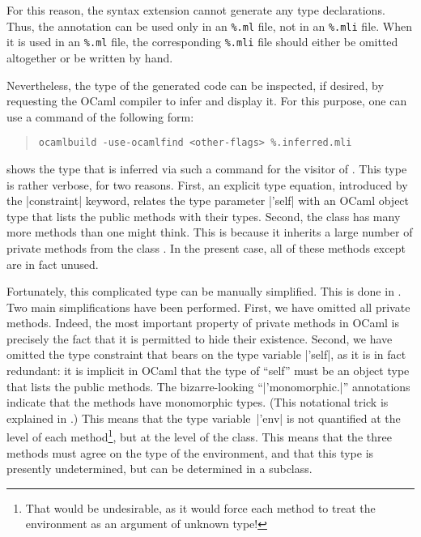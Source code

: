 \documentclass[11pt,a4paper,twoside]{article}
\begin{document}
For this reason, the \visitors syntax extension cannot generate any type
declarations. Thus, the annotation \derivingvisitors can be used only in an
\texttt{\%.ml} file, not in an \texttt{\%.mli} file. When it is used in an
\texttt{\%.ml} file, the corresponding \texttt{\%.mli} file should either be
omitted altogether or be written by hand.



Nevertheless, the type of the generated code can be inspected, if desired, by
requesting the OCaml compiler to infer and display it. For this purpose, one
can use a command of the following form:
\begin{quote}
\verb|ocamlbuild -use-ocamlfind <other-flags> %.inferred.mli|
\end{quote}

 shows the type that is inferred via such a command for the
\iter visitor of . This type is rather verbose, for two
reasons. First, an explicit type equation, introduced by the \oc|constraint|
keyword, relates the type parameter \oc|'self| with an OCaml object type that
lists the public methods with their types. Second, the class \iter has many more
methods than one might think. This is because it inherits a large number of
private methods from the class . In the present case, all of
these methods except  are in fact unused.

Fortunately, this complicated type can be manually simplified. This is done in
. Two main simplifications have been performed. First, we
have omitted all private methods. Indeed, the most important property of
private methods in OCaml is precisely the fact that it is permitted to hide
their existence. Second, we have omitted the type constraint that bears on
the type variable \oc|'self|, as it is in fact redundant: it is implicit in OCaml
that the type of ``self'' must be an object type that lists the public methods.
The bizarre-looking ``\oc|'monomorphic.|'' annotations indicate that the methods have
monomorphic types. (This notational trick is explained in .)
This means that the type variable~\oc|'env| is not quantified at the level of each
method\footnote{That would be undesirable, as it would force each method to
treat the environment as an argument of unknown type!}, but at the level of the class.
This means that the three methods must agree on the type of the environment, and
that this type is presently undetermined, but can be determined in a subclass.
\end{document}
